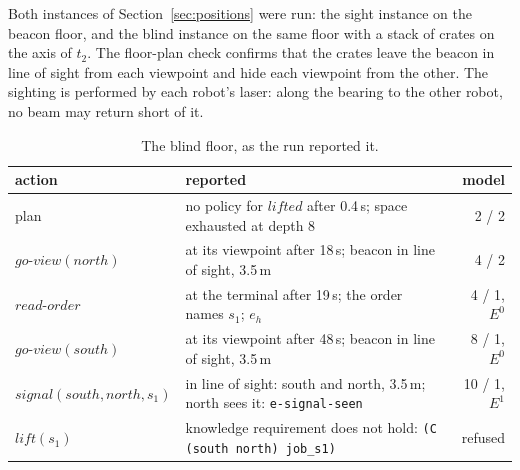 \documentclass[11pt,a4paper]{article}
\theoremstyle{definition}
\newcommand{\code}[1]{\texttt{\small #1}}
\newcommand{\ag}[1]{\mathit{#1}}
\begin{document}
Both instances of Section~\ref{sec:positions} were run: the sight instance on
the beacon floor, and the blind instance on the same floor with a stack of
crates on the axis of $t_2$. The floor-plan check confirms that the crates
leave the beacon in line of sight from each viewpoint and hide each viewpoint
from the other. The sighting is performed by each robot's laser: along the
bearing to the other robot, no beam may return short of it.

\begin{table}[H]
\centering\small
\caption{The blind floor, as the run reported it.}
\label{tab:blind-run}
\begin{tabularx}{\textwidth}{@{}l X r@{}}
\toprule
action & reported & model \\
\midrule
plan & no policy for $\mathit{lifted}$ after 0.4\,s; space exhausted at depth 8 & 2 / 2 \\
$\mathit{go\text{-}view}(\ag{north})$ & at its viewpoint after 18\,s; beacon in line of sight, 3.5\,m & 4 / 2 \\
$\mathit{read\text{-}order}$ & at the terminal after 19\,s; the order names $s_1$; $e_h$ & 4 / 1, $E^0$ \\
$\mathit{go\text{-}view}(\ag{south})$ & at its viewpoint after 48\,s; beacon in line of sight, 3.5\,m & 8 / 1, $E^0$ \\
$\mathit{signal}(\ag{south}, \ag{north}, s_1)$ & in line of sight: south and north, 3.5\,m; north sees it: \code{e-signal-seen} & 10 / 1, $E^1$ \\
$\mathit{lift}(s_1)$ & knowledge requirement does not hold: \code{(C (south north) job\_s1)} & refused \\
\bottomrule
\end{tabularx}
\end{table}
\end{document}
